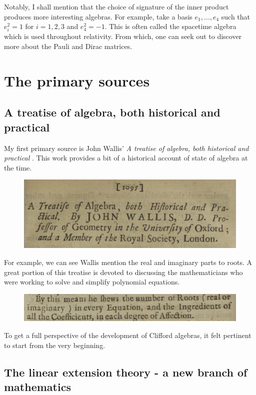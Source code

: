 \documentclass[12pt]{article}
\begin{document}
Notably, I shall mention that the choice of signature of the inner product produces more interesting algebras. For example, take a basis $e_1,\dots, e_4$ such that $e_i^2=1$ for $i=1,2,3$ and $e_4^2=-1$. This is often called the spacetime algebra which is used throughout relativity. From which, one can seek out to discover more about the Pauli and Dirac matrices.

\newpage

\section{The primary sources}

\subsection{A treatise of algebra, both historical and practical}

My first primary source is John Wallis' \emph{A treatise of algebra, both historical and practical} \cite{wallis_treatise_1685}.  This work provides a bit of a historical account of state of algebra at the time.

\begin{figure}[H]
    \centering
    \includegraphics[width=.6\textwidth]{figures/wallis_title.png}
\end{figure}

For example, we can see Wallis mention the real and imaginary parts to roots. A great portion of this treatise is devoted to discussing the mathematicians who were working to solve and simplify polynomial equations.

\begin{figure}[H]
    \centering
    \includegraphics[width=.6\textwidth]{figures/wallis_imaginary.png}
\end{figure}

To get a full perspective of the development of Clifford algebras, it felt pertinent to start from the very beginning.

\newpage
\subsection{The linear extension theory - a new branch of mathematics}
\end{document}
